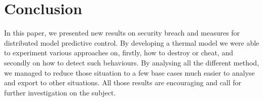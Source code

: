 \documentclass[conference]{IEEEtran}
\begin{document}
\section{Conclusion}
In this paper, we presented new results on security breach and measures for distributed model predictive control. By developing a thermal model we were able to experiment various approaches on,  firstly,  how to destroy or cheat, and secondly on how to detect such behaviours. By analysing all  the different method, we managed to reduce those situation to a few base cases much easier to analyse and export to other situations. All those results are encouraging and call for further investigation on the subject. 



\end{document}
